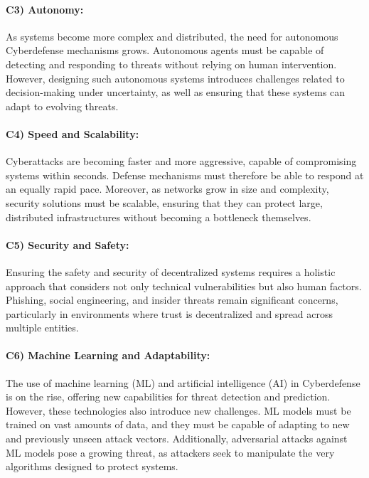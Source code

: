 \paragraph{C3) Autonomy:}
As systems become more complex and distributed, the need for autonomous Cyberdefense mechanisms grows. Autonomous agents must be capable of detecting and responding to threats without relying on human intervention\cite{taddeo2019trusting}. However, designing such autonomous systems introduces challenges related to decision-making under uncertainty, as well as ensuring that these systems can adapt to evolving threats\cite{sarker2020cybersecurity}.

\paragraph{C4) Speed and Scalability:}
Cyberattacks are becoming faster and more aggressive, capable of compromising systems within seconds. Defense mechanisms must therefore be able to respond at an equally rapid pace\cite{khraisat2019survey}. Moreover, as networks grow in size and complexity, security solutions must be scalable, ensuring that they can protect large, distributed infrastructures without becoming a bottleneck themselves\cite{berman2019survey}.

\paragraph{C5) Security and Safety:}
Ensuring the safety and security of decentralized systems requires a holistic approach that considers not only technical vulnerabilities but also human factors. Phishing, social engineering, and insider threats remain significant concerns, particularly in environments where trust is decentralized and spread across multiple entities\cite{salahdine2019social}.

\paragraph{C6) Machine Learning and Adaptability:}
The use of machine learning (ML) and artificial intelligence (AI) in Cyberdefense is on the rise, offering new capabilities for threat detection and prediction. However, these technologies also introduce new challenges. ML models must be trained on vast amounts of data, and they must be capable of adapting to new and previously unseen attack vectors\cite{xin2018machine}. Additionally, adversarial attacks against ML models pose a growing threat, as attackers seek to manipulate the very algorithms designed to protect systems\cite{apruzzese2018effectiveness}.

